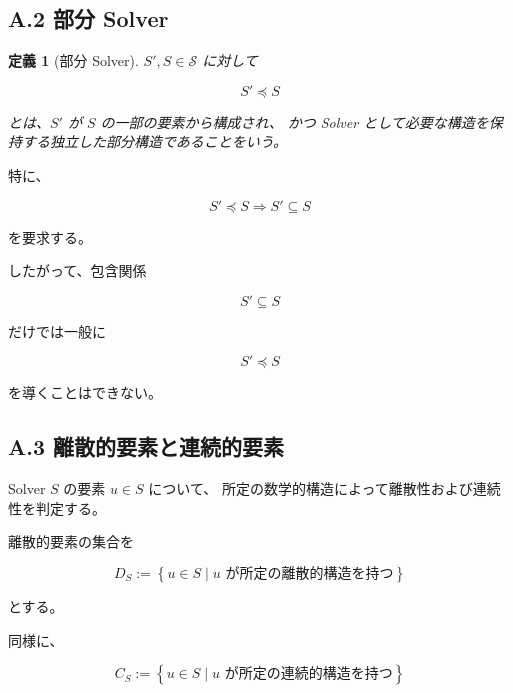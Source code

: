 \documentclass[a4paper,11pt]{article}
\newtheorem{definition}{定義}[section]
\newcommand{\Solver}{\mathcal{S}}
\newcommand{\SubSolver}{\preceq}
\begin{document}
\subsection{A.2 部分 Solver}

\begin{definition}[部分 Solver]
$S',S\in\Solver$ に対して

\begin{equation}
    S'\SubSolver S
\end{equation}

とは、$S'$ が $S$ の一部の要素から構成され、
かつ Solver として必要な構造を保持する独立した部分構造であることをいう。
\end{definition}

特に、

\begin{equation}
    S'\SubSolver S
    \Longrightarrow
    S'\subseteq S
\end{equation}

を要求する。

したがって、包含関係

\begin{equation}
    S'\subseteq S
\end{equation}

だけでは一般に

\begin{equation}
    S'\SubSolver S
\end{equation}

を導くことはできない。


\subsection{A.3 離散的要素と連続的要素}

Solver $S$ の要素 $u\in S$ について、
所定の数学的構造によって離散性および連続性を判定する。

離散的要素の集合を

\begin{equation}
    D_S
    :=
    \left\{
        u\in S
        \mid
        u\text{ が所定の離散的構造を持つ}
    \right\}
\end{equation}

とする。

同様に、

\begin{equation}
    C_S
    :=
    \left\{
        u\in S
        \mid
        u\text{ が所定の連続的構造を持つ}
    \right\}
\end{equation}
\end{document}
